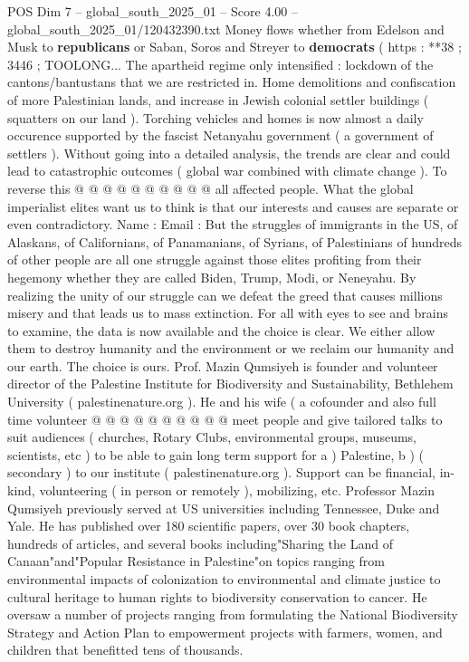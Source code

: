 \begin{textsample}{POS Dim 7 – global\_south\_2025\_01 – Score 4.00 – global\_south\_2025\_01/120432390.txt}
Money flows whether from Edelson and Musk to \textbf{republicans} or Saban, Soros and Streyer to \textbf{democrats} ( https : **38 ; 3446 ; TOOLONG...
The apartheid regime only intensified : lockdown of the cantons/bantustans that we are restricted in.
Home demolitions and confiscation of more Palestinian lands, and increase in Jewish colonial settler buildings ( squatters on our land ).
Torching vehicles and homes is now almost a daily occurence supported by the fascist Netanyahu government ( a government of settlers ).
Without going into a detailed analysis, the trends are clear and could lead to catastrophic outcomes ( global war combined with climate change ).
To reverse this @ @ @ @ @ @ @ @ @ @ all affected people.
What the global imperialist elites want us to think is that our interests and causes are separate or even contradictory.
Name : Email : But the struggles of immigrants in the US, of Alaskans, of Californians, of Panamanians, of Syrians, of Palestinians of hundreds of other people are all one struggle against those elites profiting from their hegemony whether they are called Biden, Trump, Modi, or Neneyahu.
By realizing the unity of our struggle can we defeat the greed that causes millions misery and that leads us to mass extinction.
For all with eyes to see and brains to examine, the data is now available and the choice is clear.
We either allow them to destroy humanity and the environment or we reclaim our humanity and our earth.
The choice is ours.
Prof.
Mazin Qumsiyeh is founder and volunteer director of the Palestine Institute for Biodiversity and Sustainability, Bethlehem University ( palestinenature.org ).
He and his wife ( a cofounder and also full time volunteer @ @ @ @ @ @ @ @ @ @ meet people and give tailored talks to suit audiences ( churches, Rotary Clubs, environmental groups, museums, scientists, etc ) to be able to gain long term support for a ) Palestine, b ) ( secondary ) to our institute ( palestinenature.org ).
Support can be financial, in-kind, volunteering ( in person or remotely ), mobilizing, etc.
Professor Mazin Qumsiyeh previously served at US universities including Tennessee, Duke and Yale.
He has published over 180 scientific papers, over 30 book chapters, hundreds of articles, and several books including"Sharing the Land of Canaan"and"Popular Resistance in Palestine"on topics ranging from environmental impacts of colonization to environmental and climate justice to cultural heritage to human rights to biodiversity conservation to cancer.
He oversaw a number of projects ranging from formulating the National Biodiversity Strategy and Action Plan to empowerment projects with farmers, women, and children that benefitted tens of thousands.

\end{textsample}
